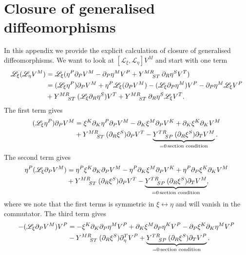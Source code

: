 \section{Closure of generalised diffeomorphisms}
In this appendix we provide the explicit calculation of closure of generalised diffeomorphisms. We want to look at $[\mathscr{L}_\xi,\mathscr{L}_\eta] V^M$ and start with one term 
\begin{equation}
    \begin{aligned}
        \mathscr{L}_{\xi}(\mathscr{L}_\eta V^M) &= \mathscr{L}_\xi(\eta^P\pd_PV^M-\pd_P\eta^MV^P+\tensor{Y}{^{MR}_{ST}}\pd_R\eta^S V^T)\\
        &= (\mathscr{L}_\xi \eta^P)\pd_PV^M+\eta^P\mathscr{L}_\xi(\pd_PV^M)-(\mathscr{L}_\xi\pd_P\eta^M)V^P-\pd_P\eta^M\mathscr{L}_\xi V^P\\
        &+\tensor{Y}{^{MR}_{ST}}(\mathscr{L}_\xi\pd_R\eta^S)V^T+\tensor{Y}{^{MR}_{ST}}\pd_R\eta^S\mathscr{L}_\xi V^T.
    \end{aligned}
\end{equation}
The first term gives 
\begin{equation}
    \begin{aligned}
        (\mathscr{L}_\xi\eta^P)\pd_PV^M &= \xi^K\pd_K\eta^P\pd_PV^M-\pd_K\xi^M\pd_PV^K+\pd_K\xi^K\pd_KV^M\\
        &+\tensor{Y}{^{MR}_{ST}}(\pd_R\xi^S)\pd_PV^T-\underbrace{\tensor{Y}{^{TR}_{SP}}(\pd_R\xi^S)\pd_TV^M}_{=0\,\text{section condition}}.
    \end{aligned}
\end{equation}
The second term gives 
\begin{equation}
    \begin{aligned}
        \eta^P(\mathscr{L}_\xi\pd_PV^M) &= \eta^P\xi^K\pd_K\pd_PV^M-\eta^P\pd_K\xi^M\pd_PV^K+\eta^P\pd_P\xi^K\pd_KV^M\\
        &+ \tensor{Y}{^{MR}_{ST}}(\pd_R\xi^S)\pd_PV^T-\underbrace{\tensor{Y}{^{TR}_{SP}}(\pd_R\xi^S)\pd_TV^M}_{=0\, \text{section condition}},
    \end{aligned}
\end{equation}
where we note that the first terms is symmetric in $\xi\leftrightarrow\eta$ and will vanish in the commutator. The third term gives 
\begin{equation}
    \begin{aligned}
        -(\mathscr{L}_\xi\pd_PV^M)V^P&=-\xi^K\pd_K\pd_P\eta^MV^P+\pd_K\xi^M\pd_P\eta^KV^P-\pd_P\xi^K\pd_K\eta^MV^P\\
        &-\tensor{Y}{^{MR}_{ST}}(\pd_R\xi^S)\pd_\eta^TV^P+\underbrace{\tensor{Y}{^{TR}_{SP}}(\pd_R\xi^S)\pd_TV^P}_{=0\, \text{section condition}}.
    \end{aligned}
\end{equation}
